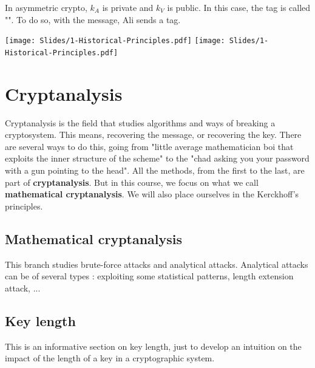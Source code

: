 \documentclass[a4paper, 12pt]{book}
\begin{document}
In asymmetric crypto, $k_A$ is private and $k_V$ is public. In this case, the tag is called "".
To do so, with the message, Ali sends a tag. \\

\begin{center}
    \texttt{[image: Slides/1-Historical-Principles.pdf]}
    \texttt{[image: Slides/1-Historical-Principles.pdf]}
\end{center}

\section{Cryptanalysis}
Cryptanalysis is the field that studies algorithms and ways of breaking a cryptosystem. This means, recovering the message, or recovering the key. There are several ways to do this, going from "little average mathematician boi that exploits the inner structure of the scheme" to the "chad asking you your password with a gun pointing to the head". All the methods, from the first to the last, are part of \textbf{cryptanalysis}. But in this course, we focus on what we call \textbf{mathematical cryptanalysis}. We will also place ourselves in the Kerckhoff's principles.\\


\subsection{Mathematical cryptanalysis}

This branch studies brute-force attacks and analytical attacks. Analytical attacks can be of several types : exploiting some statistical patterns, length extension attack, ... \\

\subsection{Key length}
This is an informative section on key length, just to develop an intuition on the impact of the length of a key in a cryptographic system. \\
\end{document}
